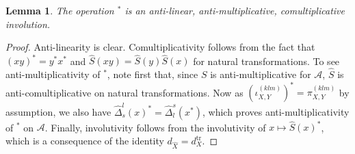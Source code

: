 \documentclass[10pt]{article}
\DeclareMathOperator{\tr}{\mathrm{tr}}
\newtheorem{Lem}[Theorem]{Lemma}
\theoremstyle{definition}
\numberwithin{equation}{section}
\begin{document}
\begin{Lem} The operation $^*$ is an anti-linear, anti-multiplicative, comultiplicative involution.
\end{Lem}

\begin{proof} Anti-linearity is clear. Comultiplicativity follows from the fact that $(xy)^* = y^*x^*$ and $\hat{S}(xy) = \hat{S}(y)\hat{S}(x)$ for natural transformations. To see anti-multiplicativity of $^*$, note first that, since $S$ is anti-multiplicative for $\mathscr{A}$, $\hat{S}$ is anti-comultiplicative on natural transformations. Now as $(\iota_{X,Y}^{(klm)})^* = \pi_{X,Y}^{(klm)}$ by assumption, we also have $\hat{\Delta}^l_s(x)^* = \hat{\Delta}^s_l(x^*)$, which proves anti-multiplicativity of $^*$ on $\mathscr{A}$.  Finally, involutivity follows from the involutivity of $x\mapsto \hat{S}(x)^*$, which is a consequence of the identity $d_{\hat{X}} = d_X^{\tr}$. 
\end{proof}
\end{document}
